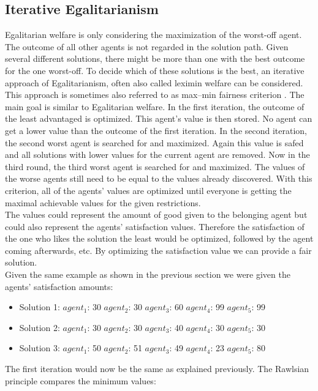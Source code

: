 \documentclass[german, a4paper, 11pt, oneside]{scrbook}
\begin{document}
\subsection{Iterative Egalitarianism}
Egalitarian welfare is only considering the maximization of the worst-off agent. The outcome of all other agents is not regarded in the solution path. Given several different solutions, there might be more than one with the best outcome for the one worst-off. To decide which of these solutions is the best, an iterative approach of Egalitarianism, often also called leximin \cite{Plaut.15.07.2017} welfare can be considered. This approach is sometimes also referred to as max–min fairness criterion \cite[p.234]{Kubiak}. The main goal is similar to Egalitarian welfare. In the first iteration, the outcome of the least advantaged is optimized. This agent's value is then stored. No agent can get a lower value than the outcome of the first iteration. \cite{Kubiak} In the second iteration, the second worst agent is searched for and maximized. Again this value is safed and all solutions with lower values for the current agent are removed. Now in the third round, the third worst agent is searched for and maximized. The values of the worse agents still need to be equal to the values already discovered. With this criterion, all of the agents' values are optimized until everyone is getting the maximal achievable values for the given restrictions. \cite{Hooker,Brandt,Chen.2020} \\The values could represent the amount of good given to the belonging agent but could also represent the agents' satisfaction values. Therefore the satisfaction of the one who likes the solution the least would be optimized, followed by the agent coming afterwards, etc. By optimizing the satisfaction value we can provide a fair solution.
\\Given the same example as shown in the previous section we were given the agents' satisfaction amounts:
\begin{itemize}
\item Solution 1: $agent_1$: 30 $agent_2$: 30  $agent_3$: 60 $agent_4$: 99 $agent_5$: 99
\item Solution 2: $agent_1$: 30 $agent_2$: 30  $agent_3$: 40 $agent_4$: 30 $agent_5$: 30
\item Solution 3: $agent_1$: 50 $agent_2$: 51  $agent_3$: 49 $agent_4$: 23 $agent_5$: 80
\end{itemize}
The first iteration would now be the same as explained previously.
The Rawlsian principle compares the minimum values:
\end{document}
